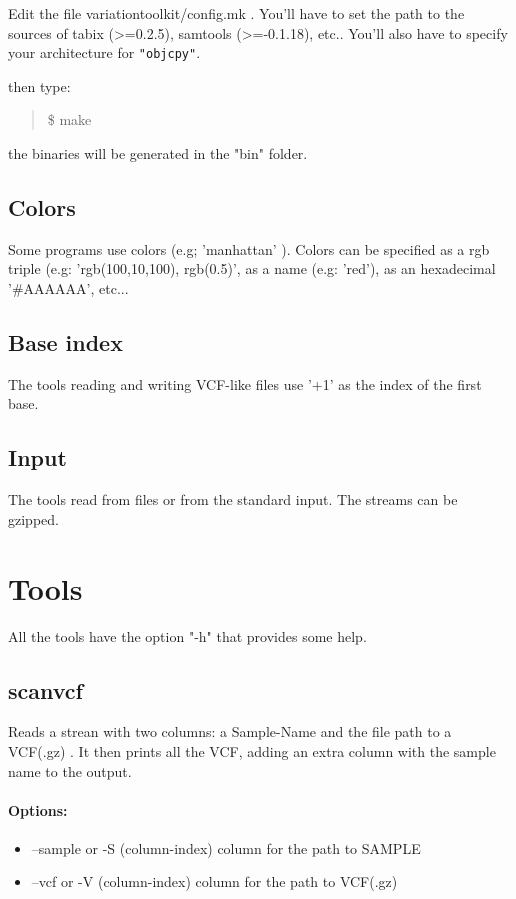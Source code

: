 \documentclass[12pt]{article}
\begin{document}
Edit the file variationtoolkit/config.mk . You'll have to set the path to the sources of tabix (>=0.2.5), samtools (>=-0.1.18), etc..
You'll also have to specify your architecture for \texttt{"objcpy"}.

then type:
\begin{quote}
\$ make
\end{quote}
the binaries will be generated in the "bin" folder.

\subsection{Colors}
Some programs use colors (e.g; 'manhattan' ). Colors can be specified as a rgb triple (e.g: 'rgb(100,10,100), rgb(0.5)', as a name (e.g: 'red'), as an hexadecimal '\#AAAAAA', etc...
\subsection{Base index}
The tools reading and writing VCF-like files use '+1' as the index of the first base.
\subsection{Input}
The tools read from files or from the standard input. The streams can be gzipped.

\section{Tools}
All the tools have the option "-h" that provides some help.


\subsection{scanvcf}
Reads a strean with two columns: a Sample-Name and the file path to a VCF(.gz) . It then prints all the VCF, adding an extra column with the sample name to the output.

\paragraph{Options:}
\begin{itemize}
\item--sample or -S (column-index) column for the path to SAMPLE 
\item--vcf or -V (column-index) column for the path to VCF(.gz)
\end{itemize}
\end{document}
